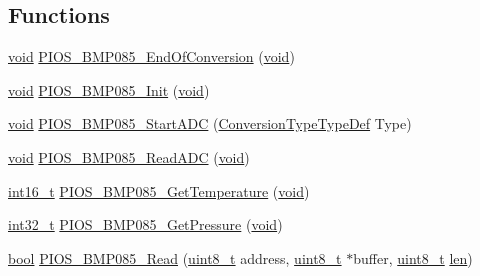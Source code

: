 \subsection*{Functions}
\begin{DoxyCompactItemize}
\item 
\hyperlink{group___n_a_m_e_ga18028b8badbf1ea7e704ccac3c488e82}{void} \hyperlink{group___p_i_o_s___b_m_p085_ga10dbc872cbdcc5069ec1b54bd08c8bba}{P\-I\-O\-S\-\_\-\-B\-M\-P085\-\_\-\-End\-Of\-Conversion} (\hyperlink{group___n_a_m_e_ga18028b8badbf1ea7e704ccac3c488e82}{void})
\item 
\hyperlink{group___n_a_m_e_ga18028b8badbf1ea7e704ccac3c488e82}{void} \hyperlink{group___p_i_o_s___b_m_p085_gadf378990e49a77f5d07c537d6421d4b3}{P\-I\-O\-S\-\_\-\-B\-M\-P085\-\_\-\-Init} (\hyperlink{group___n_a_m_e_ga18028b8badbf1ea7e704ccac3c488e82}{void})
\item 
\hyperlink{group___n_a_m_e_ga18028b8badbf1ea7e704ccac3c488e82}{void} \hyperlink{group___p_i_o_s___b_m_p085_gac2f3a7e293bc2263af4dad0a1ca21d51}{P\-I\-O\-S\-\_\-\-B\-M\-P085\-\_\-\-Start\-A\-D\-C} (\hyperlink{group___p_i_o_s___b_m_p085_ga9cea215e6c64f123b3561819d5219785}{Conversion\-Type\-Type\-Def} Type)
\item 
\hyperlink{group___n_a_m_e_ga18028b8badbf1ea7e704ccac3c488e82}{void} \hyperlink{group___p_i_o_s___b_m_p085_gae4ba8dc8cb3bda6b4ca92c4c70049e4e}{P\-I\-O\-S\-\_\-\-B\-M\-P085\-\_\-\-Read\-A\-D\-C} (\hyperlink{group___n_a_m_e_ga18028b8badbf1ea7e704ccac3c488e82}{void})
\item 
\hyperlink{stdint_8h_aa343fa3b3d06292b959ffdd4c4703b06}{int16\-\_\-t} \hyperlink{group___p_i_o_s___b_m_p085_ga5f409188609c693a05e083aeb468907f}{P\-I\-O\-S\-\_\-\-B\-M\-P085\-\_\-\-Get\-Temperature} (\hyperlink{group___n_a_m_e_ga18028b8badbf1ea7e704ccac3c488e82}{void})
\item 
\hyperlink{group___n_a_m_e_gafd12020da5a235dfcf0c3c748fb5baed}{int32\-\_\-t} \hyperlink{group___p_i_o_s___b_m_p085_ga7aab68a5108a124046196c3f737f1c98}{P\-I\-O\-S\-\_\-\-B\-M\-P085\-\_\-\-Get\-Pressure} (\hyperlink{group___n_a_m_e_ga18028b8badbf1ea7e704ccac3c488e82}{void})
\item 
\hyperlink{group___exported__types_gaf6a258d8f3ee5206d682d799316314b1}{bool} \hyperlink{group___p_i_o_s___b_m_p085_ga3bc6ca92960659541d0879b831b6585c}{P\-I\-O\-S\-\_\-\-B\-M\-P085\-\_\-\-Read} (\hyperlink{stdint_8h_aba7bc1797add20fe3efdf37ced1182c5}{uint8\-\_\-t} address, \hyperlink{stdint_8h_aba7bc1797add20fe3efdf37ced1182c5}{uint8\-\_\-t} $\ast$buffer, \hyperlink{stdint_8h_aba7bc1797add20fe3efdf37ced1182c5}{uint8\-\_\-t} \hyperlink{mavlink__helpers_8h_aba59486c1504340293255a065b546e3a}{len})

\end{DoxyCompactItemize}
